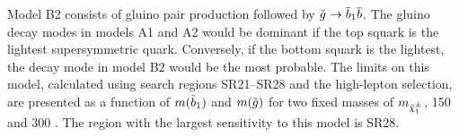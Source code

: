 Model B2 consists of gluino pair production followed by $\tilde{\relax{g}} \to \tilde{\relax{b}}_1
\overline{\relax{b}}$. The gluino decay modes in models A1 and A2 would be dominant if the
top squark is the lightest supersymmetric quark. Conversely, if the bottom
squark is the lightest, the decay mode in model B2 would be the most probable.
The limits on this model, calculated using search regions SR21--SR28 and the
high-\pt lepton selection, are presented as a function of $m(\tilde{\relax{b}}_1)$ and
$m(\tilde{\relax{g}})$ for two fixed masses of $m_{\tilde{\chi}^{\pm}_1}$, 150 and 300 \GeV. The region
with the largest sensitivity to this model is SR28.
\begin{figure}[!tbh]
\end{figure}
\clearpage

